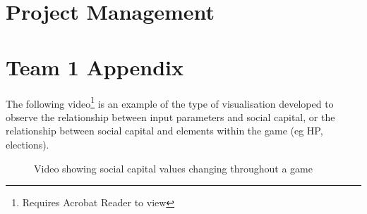 \chapter{Project Management}\label{sec:proj-mgmt}

\chapter{Team 1 Appendix}

The following video\footnote{Requires Acrobat Reader to view} is an example of the type of visualisation developed to observe the relationship between input parameters and social capital, or the relationship between social capital and elements within the game (eg HP, elections).

\begin{figure}[!h]
\begin{frame}{}
  \centering
  
\end{frame}
\caption{Video showing social capital values changing throughout a game}
  \label{ani:sc_visual_vid}
\end{figure}